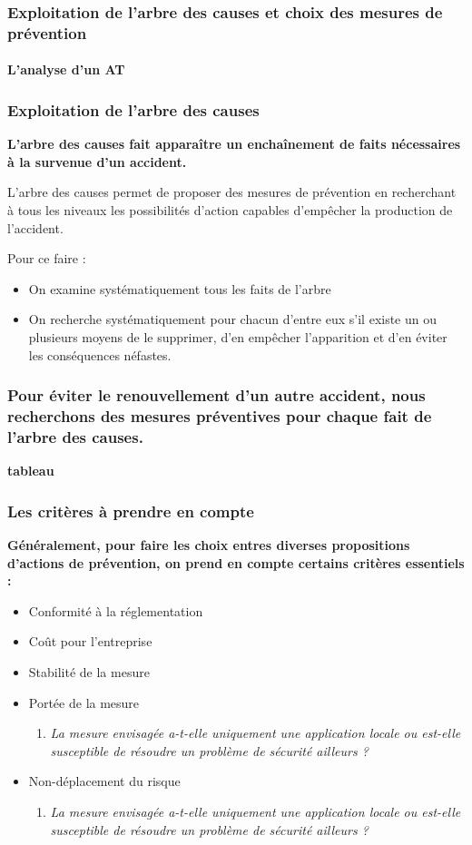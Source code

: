 \documentclass{beamer}
\begin{document}
\begin{frame}
\frametitle{Exploitation de l’arbre des causes et choix des mesures de prévention}
\framesubtitle{L’analyse d'un AT}

\end{frame}

\begin{frame}
\frametitle{Exploitation de l’arbre des causes}

\textbf{L’arbre des causes fait apparaître un enchaînement de faits nécessaires à la survenue d’un accident.}

L’arbre des causes permet de proposer des mesures de prévention en recherchant à tous les niveaux les possibilités d’action capables d’empêcher la production de l’accident.

Pour ce faire :
\begin{itemize}
\item On examine systématiquement tous les faits de l’arbre
\item On recherche systématiquement pour chacun d’entre eux s’il existe un ou plusieurs moyens de le supprimer, d’en empêcher l’apparition et d’en éviter les conséquences néfastes.
\end{itemize}
\end{frame}

\begin{frame}
\frametitle{Pour éviter le renouvellement d’un autre accident, nous recherchons
des mesures préventives pour chaque fait de l’arbre des causes.}

\textbf{tableau}
\end{frame}

\begin{frame}
\frametitle{Les critères à prendre en compte}

\textbf{Généralement, pour faire les choix entres diverses propositions d’actions de prévention, on prend en compte certains critères essentiels :}
\begin{itemize}
\item Conformité à la réglementation
\item Coût pour l’entreprise
\item Stabilité de la mesure
\item Portée de la mesure
\begin{enumerate}
	\item \textit{La mesure envisagée a-t-elle uniquement une application locale ou est-elle susceptible de résoudre un problème de sécurité ailleurs ?}
\end{enumerate}
\item Non-déplacement du risque
\begin{enumerate}
	\item \textit{La mesure envisagée a-t-elle uniquement une application locale ou est-elle susceptible de résoudre un problème de sécurité ailleurs ?}
\end{enumerate}
\end{itemize}
\end{frame}
\end{document}
